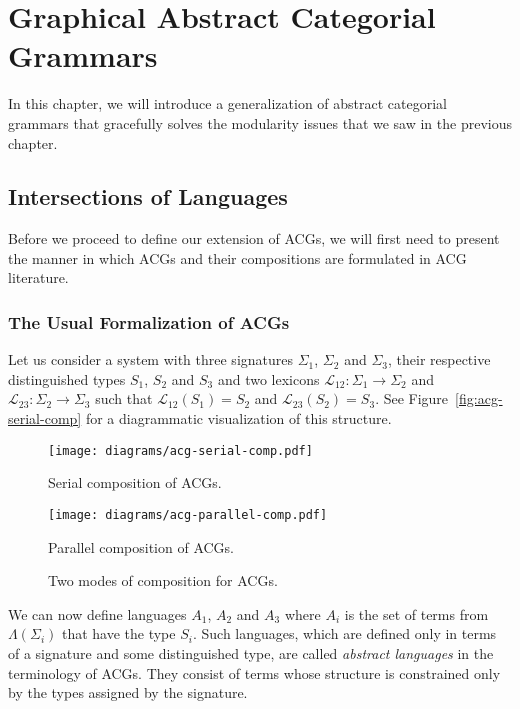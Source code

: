 \chapter{Graphical Abstract Categorial Grammars}
\label{chap:gacg}

In this chapter, we will introduce a generalization of abstract
categorial grammars that gracefully solves the modularity issues that we
saw in the previous chapter.

\section{Intersections of Languages}
\label{sec:sects-of-langs}

Before we proceed to define our extension of ACGs, we will first need to
present the manner in which ACGs and their compositions are formulated
in ACG literature.

\subsection{The Usual Formalization of ACGs}
\label{ssec:usual-acgs}

Let us consider a system with three signatures $\Sigma_1$, $\Sigma_2$
and $\Sigma_3$, their respective distinguished types $S_1$, $S_2$ and
$S_3$ and two lexicons $\mathcal{L}_{12} : \Sigma_1 \to \Sigma_2$ and
$\mathcal{L}_{23} : \Sigma_2 \to \Sigma_3$ such that
$\mathcal{L}_{12}(S_1) = S_2$ and $\mathcal{L}_{23}(S_2) = S_3$. See
Figure~\ref{fig:acg-serial-comp} for a diagrammatic visualization of
this structure.

\begin{figure}[t]
  \centering
  \begin{minipage}[b]{0.4\textwidth}
    \centering
    \texttt{[image: diagrams/acg-serial-comp.pdf]}
    \caption{\label{fig:acg-serial-comp} Serial composition of ACGs.}
  \end{minipage}
  \qquad
  \begin{minipage}[b]{0.4\textwidth}
    \centering
    \texttt{[image: diagrams/acg-parallel-comp.pdf]}
    \caption{\label{fig:acg-parallel-comp} Parallel composition of ACGs.}
  \end{minipage}
  \caption{\label{fig:acg-comp-modes} Two modes of composition for
    ACGs.}
\end{figure}

We can now define languages $A_1$, $A_2$ and $A_3$ where $A_i$ is the
set of terms from $\Lambda(\Sigma_i)$ that have the type $S_i$. Such
languages, which are defined only in terms of a signature and some
distinguished type, are called \emph{abstract languages} in the
terminology of ACGs. They consist of terms whose structure is
constrained only by the types assigned by the signature.

